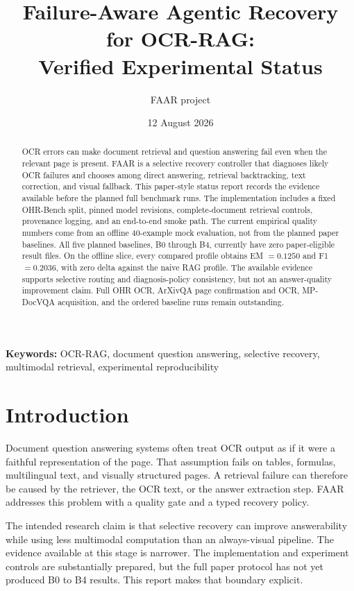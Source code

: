 \documentclass[10pt,twocolumn]{article}
\title{Failure-Aware Agentic Recovery for OCR-RAG:\\
Verified Experimental Status}
\author{FAAR project}
\date{12 August 2026}
\begin{document}
\maketitle

\begin{abstract}
OCR errors can make document retrieval and question answering fail even when the relevant page is present. FAAR is a selective recovery controller that diagnoses likely OCR failures and chooses among direct answering, retrieval backtracking, text correction, and visual fallback. This paper-style status report records the evidence available before the planned full benchmark runs. The implementation includes a fixed OHR-Bench split, pinned model revisions, complete-document retrieval controls, provenance logging, and an end-to-end smoke path. The current empirical quality numbers come from an offline 40-example mock evaluation, not from the planned paper baselines. All five planned baselines, B0 through B4, currently have zero paper-eligible result files. On the offline slice, every compared profile obtains EM $=0.1250$ and F1 $=0.2036$, with zero delta against the naive RAG profile. The available evidence supports selective routing and diagnosis-policy consistency, but not an answer-quality improvement claim. Full OHR OCR, ArXivQA page confirmation and OCR, MP-DocVQA acquisition, and the ordered baseline runs remain outstanding.
\end{abstract}

\textbf{Keywords:} OCR-RAG, document question answering, selective recovery, multimodal retrieval, experimental reproducibility

\section{Introduction}

Document question answering systems often treat OCR output as if it were a faithful representation of the page. That assumption fails on tables, formulas, multilingual text, and visually structured pages. A retrieval failure can therefore be caused by the retriever, the OCR text, or the answer extraction step. FAAR addresses this problem with a quality gate and a typed recovery policy.

The intended research claim is that selective recovery can improve answerability while using less multimodal computation than an always-visual pipeline. The evidence available at this stage is narrower. The implementation and experiment controls are substantially prepared, but the full paper protocol has not yet produced B0 to B4 results. This report makes that boundary explicit.
\end{document}
